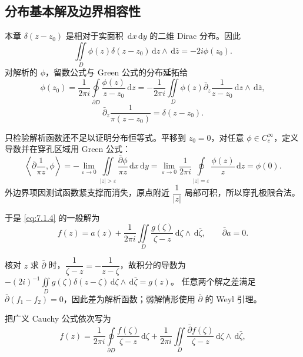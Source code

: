 \documentclass[lang=cn,scheme=chinese,mode=simple,device=normal,color=blue,math=cm,thmcnt=section,12pt]{elegantbook}
\newcommand{\dd}{\,\mathrm{d}}
\newcommand{\eqq}[2]{\tag{#1}\label{eq:#1}#2}
\begin{document}
\subsection{分布基本解及边界相容性}
本章 $\delta(z-z_0)$ 是相对于实面积 $\dd x\dd y$ 的二维 Dirac 分布。因此
\begin{equation}
\eqq{7.1.19}{\iint\limits_D\phi(z)\delta(z-z_0)\dd z\wedge\dd\bar z=-2i\phi(z_0).}
\end{equation}
对解析的 $\phi$，留数公式与 Green 公式的分布延拓给
\begin{equation}
\eqq{7.1.20}{\phi(z_0)=\dfrac{1}{2\pi i}\oint\limits_{\partial D}\dfrac{\phi(z)}{z-z_0}\dd z
=-\dfrac{1}{2\pi i}\iint\limits_D\phi(z)\bar\partial_z\dfrac{1}{z-z_0}\dd z\wedge\dd\bar z,}
\end{equation}
\begin{equation}
\eqq{7.1.21}{\bar\partial_z\dfrac{1}{\pi(z-z_0)}=\delta(z-z_0).}
\end{equation}
\begin{callout}
只检验解析函数还不足以证明分布恒等式。平移到 $z_0=0$，对任意 $\phi\in C_c^\infty$，定义导数并在穿孔区域用 Green 公式：
\[
\left\langle\bar\partial\dfrac{1}{\pi z},\phi\right\rangle
=-\lim\limits_{\varepsilon\to0}\iint\limits_{|z|>\varepsilon}\dfrac{\bar\partial\phi}{\pi z}\dd x\dd y
=\lim\limits_{\varepsilon\to0}\dfrac{1}{2\pi i}\oint\limits_{|z|=\varepsilon}\dfrac{\phi(z)}{z}\dd z=\phi(0).
\]
外边界项因测试函数紧支撑而消失，原点附近 $\dfrac{1}{|z|}$ 局部可积，所以穿孔极限合法。
\end{callout}
于是 \eqref{eq:7.1.4} 的一般解为
\begin{equation}
\eqq{7.1.22}{f(z)=a(z)+\dfrac{1}{2\pi i}\iint\limits_D\dfrac{g(\zeta)}{\zeta-z}\dd\zeta\wedge\dd\bar\zeta,\qquad \bar\partial a=0.}
\end{equation}
\begin{callout}
核对 $z$ 求 $\bar\partial$ 时，$\dfrac{1}{\zeta-z}=-\dfrac{1}{z-\zeta}$，故积分的导数为
$\displaystyle-(2i)^{-1}\iint\limits_Dg(\zeta)\delta(z-\zeta)\dd\zeta\wedge\dd\bar\zeta=g(z)$。
任意两个解之差满足 $\bar\partial(f_1-f_2)=0$，因此差为解析函数；弱解情形使用 $\bar\partial$ 的 Weyl 引理。
\end{callout}
把广义 Cauchy 公式依次写为
\begin{equation}
\eqq{7.1.23}{f(z)=\dfrac{1}{2\pi i}\oint\limits_{\partial D}\dfrac{f(\zeta)}{\zeta-z}\dd\zeta
+\dfrac{1}{2\pi i}\iint\limits_D\dfrac{\bar\partial f(\zeta)}{\zeta-z}\dd\zeta\wedge\dd\bar\zeta,}
\end{equation}
\end{document}
